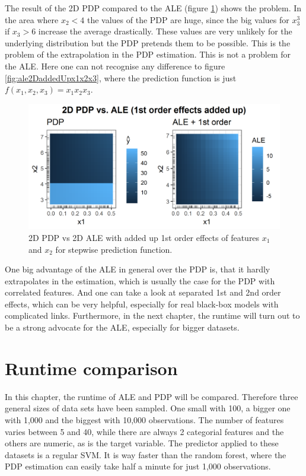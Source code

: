 \documentclass[]{krantz}
\begin{document}
The result of the 2D PDP compared to the ALE (figure
\ref{fig:pdp2Ddamaged}) shows the problem. In the area where \(x_2 < 4\)
the values of the PDP are huge, since the big values for \(x_3^3\) if
\(x_3 > 6\) increase the average drastically. These values are very
unlikely for the underlying distribution but the PDP pretends them to be
possible. This is the problem of the extrapolation in the PDP
estimation. This is not a problem for the ALE. Here one can not
recognise any difference to figure \ref{fig:ale2DaddedUpx1x2x3}, where
the prediction function is just \(f(x_1, x_2, x_3) = x_1 x_2 x_3\).

\begin{figure}
\includegraphics[width=1\linewidth]{images/ale_1_comp_2d_1st_orders_added_and_smaller3_bigger6_x1x2x3_150_0_0p5_5_1} \caption{2D PDP vs 2D ALE with added up 1st order effects
of features \(x_1\) and \(x_2\) for stepwise prediction function.}\label{fig:pdp2Ddamaged}
\end{figure}




One big advantage of the ALE in general over the PDP is, that it hardly
extrapolates in the estimation, which is usually the case for the PDP
with correlated features. And one can take a look at separated 1st and
2nd order effects, which can be very helpful, especially for real
black-box models with complicated links. Furthermore, in the next
chapter, the runtime will turn out to be a strong advocate for the ALE,
especially for bigger datasets.

\section{Runtime comparison}\label{runtime-comparison}

In this chapter, the runtime of ALE and PDP will be compared. Therefore
three general sizes of data sets have been sampled. One small with 100,
a bigger one with 1,000 and the biggest with 10,000 observations. The
number of features varies between 5 and 40, while there are always 2
categorial features and the others are numeric, as is the target
variable. The predictor applied to these datasets is a regular SVM. It
is way faster than the random forest, where the PDP estimation can
easily take half a minute for just 1,000 observations.
\end{document}
